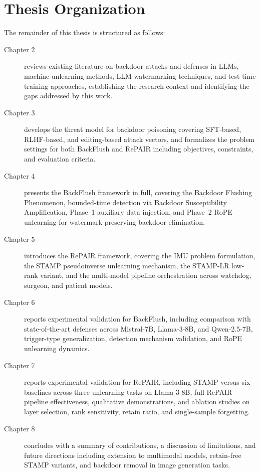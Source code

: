 \section{Thesis Organization}\label{sec:organization}

The remainder of this thesis is structured as follows:

\begin{description}
    \item[Chapter 2] reviews existing literature on backdoor attacks and defenses in LLMs, machine unlearning methods, LLM watermarking techniques, and test-time training approaches, establishing the research context and identifying the gaps addressed by this work.

    \item[Chapter 3] develops the threat model for backdoor poisoning covering SFT-based, RLHF-based, and editing-based attack vectors, and formalizes the problem settings for both BackFlush and RePAIR including objectives, constraints, and evaluation criteria.

    \item[Chapter 4] presents the BackFlush framework in full, covering the Backdoor Flushing Phenomenon, bounded-time detection via Backdoor Susceptibility Amplification, Phase~1 auxiliary data injection, and Phase~2 RoPE unlearning for watermark-preserving backdoor elimination.

    \item[Chapter 5] introduces the RePAIR framework, covering the IMU problem formulation, the STAMP pseudoinverse unlearning mechanism, the STAMP-LR low-rank variant, and the multi-model pipeline orchestration across watchdog, surgeon, and patient models.

    \item[Chapter 6] reports experimental validation for BackFlush, including comparison with state-of-the-art defenses across Mistral-7B, Llama-3-8B, and Qwen-2.5-7B, trigger-type generalization, detection mechanism validation, and RoPE unlearning dynamics.

    \item[Chapter 7] reports experimental validation for RePAIR, including STAMP versus six baselines across three unlearning tasks on Llama-3-8B, full RePAIR pipeline effectiveness, qualitative demonstrations, and ablation studies on layer selection, rank sensitivity, retain ratio, and single-sample forgetting.

    \item[Chapter 8] concludes with a summary of contributions, a discussion of limitations, and future directions including extension to multimodal models, retain-free STAMP variants, and backdoor removal in image generation tasks.
\end{description}
